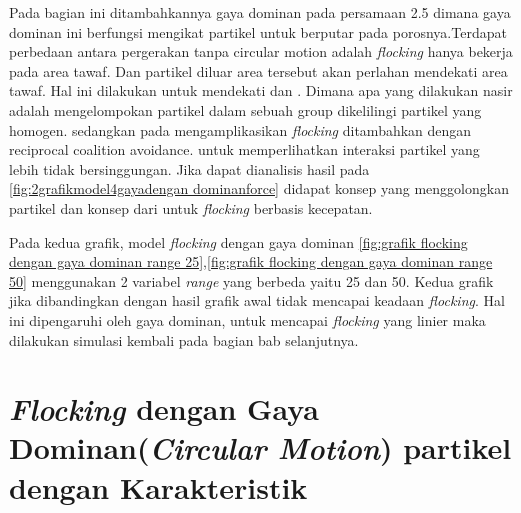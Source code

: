 \hspace{0.6cm} Pada bagian ini ditambahkannya gaya dominan pada persamaan 2.5 dimana gaya dominan ini berfungsi mengikat partikel untuk berputar pada porosnya.Terdapat perbedaan antara pergerakan tanpa circular motion adalah \textit{flocking} hanya bekerja pada area tawaf. Dan partikel diluar area tersebut akan perlahan mendekati area tawaf. Hal ini dilakukan untuk mendekati \citep{Nasir2016} dan \citep{Kim2014}. Dimana apa yang dilakukan nasir adalah mengelompokan partikel dalam sebuah group dikelilingi partikel yang homogen. sedangkan pada \citep{Kim2014} mengamplikasikan \textit{flocking} ditambahkan dengan reciprocal coalition avoidance. untuk memperlihatkan interaksi partikel yang lebih tidak bersinggungan. Jika dapat dianalisis hasil pada \ref{fig:2grafikmodel4gayadengan dominanforce} didapat konsep \citep{Nasir2016} yang menggolongkan partikel dan konsep dari \citep{Kim2014} untuk \textit{flocking} berbasis kecepatan.

\hspace{0.6cm}Pada kedua grafik, model \textit{flocking} dengan gaya dominan \ref{fig:grafik flocking dengan gaya dominan range 25},\ref{fig:grafik flocking dengan gaya dominan range 50} menggunakan 2 variabel \textit{range} yang berbeda yaitu 25 dan 50. Kedua grafik jika dibandingkan dengan hasil grafik awal tidak mencapai keadaan \textit{flocking}. Hal ini dipengaruhi oleh gaya dominan, untuk mencapai \textit{flocking} yang linier maka dilakukan simulasi kembali pada bagian bab selanjutnya. 

\section{\textit{Flocking} dengan Gaya Dominan(\textit{Circular Motion}) partikel dengan Karakteristik}%

